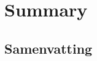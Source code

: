 
\cleardoublepage\thispagestyle{empty}




\cleardoublepage\thispagestyle{empty}
\chapter*{Summary}

\cleardoublepage\thispagestyle{empty}
\begin{otherlanguage}{dutch}
\chapter*{Samenvatting}

\end{otherlanguage}

\backmatter
\hypersetup{urlcolor=darkgreen}
\printbibliography  %
\hypersetup{urlcolor=darkblue}
%

%

